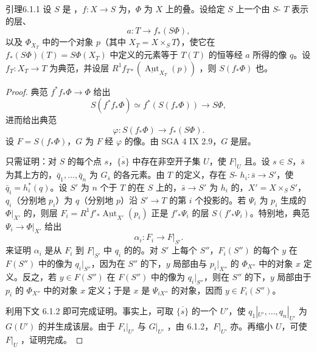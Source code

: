 \begin{SGAresult}{引理}{6.1.1}
设 $S$ 是 ，$f:X\to S$ 为，$\Phi$ 为 $X$ 上的叠。设给定 $S$ 上一个由 $S$- $T$ 表示的层、
\[a:T\longrightarrow f_*(S\Phi),\]
以及 $\Phi_{X_T}$ 中的一个对象 $p$（其中 $X_T=X\times_S T$），使它在 $f_*(S\Phi)(T)=S\Phi(X_T)$ 中定义的元素等于 $T(T)$ 的恒等经 $a$ 所得的像 $q$。设 $f_T:X_T\to T$ 为典范，并设层 $R^1f_{T*}(\underline{\operatorname{Aut}}_{X_T}(p))$ ，则 $S(f_*\Phi)$ 也。
\end{SGAresult}
\begin{proof}
典范 $f^*f_*\Phi\to\Phi$ 给出
\[S(f^*f_*\Phi)\simeq f^*(S(f_*\Phi))\longrightarrow S\Phi,\]
进而给出典范
\[\varphi:S(f_*\Phi)\longrightarrow f_*(S\Phi).\]
设 $F=S(f_*\Phi)$，$G$ 为 $F$ 经 $\varphi$ 的像。由 SGA 4 IX 2.9，$G$ 是层。

只需证明：对 $S$ 的每个点 $s$，$\overline{\{s\}}$ 中存在非空开子集 $U$，使 $F|_U$ 且。设 $s\in S$，$\bar s$ 为其上方的，$\bar q_1,\ldots,\bar q_n$ 为 $G_{\bar s}$ 的各元素。由 $T$ 的定义，存在 $S$- $h_i:\bar s\to S'$，使 $\bar q_i=h_i^*(q)$。设 $S'$ 为 $n$ 个于 $T$ 的在 $S$ 上的，$\bar s\to S'$ 为 $h_i$ 的，$X'=X\times_S S'$，$q_i$（分别地 $p_i$）为 $q$（分别地 $p$）沿 $S'\to T$ 的第 $i$ 个投影的。若 $\Psi_i$ 为 $p_i$ 生成的 $\Phi|_{X'}$ 的，则层 $F_i=R^1f'_*\underline{\operatorname{Aut}}_{X'}(p_i)$ 正是 $f'_*\Psi_i$ 的层 $S(f'_*\Psi_i)$。特别地，典范 $\Psi_i\to\Phi|_{X'}$ 给出
\[\alpha_i:F_i\longrightarrow F|_{S'}.\]
来证明 $\alpha_i$ 是从 $F_i$ 到 $F|_{S'}$ 中 $q_i$ 的的。对 $S'$ 上每个 $S''$，$F_i(S'')$ 的每个 $y$ 在 $F(S'')$ 中的像为 $q_i|_{S''}$，因为在 $S''$ 的下，$y$ 局部由与 $p_i|_{X''}$ 的 $\Phi_{X''}$ 中的对象 $x$ 定义。反之，若 $y\in F(S'')$ 在 $F(S'')$ 中的像为 $q_i|_{S''}$，则在 $S''$ 的下，$y$ 局部由于 $p_i$ 的 $\Phi_{X''}$ 中的对象 $x$ 定义；于是 $x$ 是 $\Psi_{iX''}$ 的对象，因而 $y\in F_i(S'')$。

利用下文 6.1.2 即可完成证明。事实上，可取 $\overline{\{s\}}$ 的一个 $U'$，使 $q_1|_{U'},\ldots,q_n|_{U'}$ 为 $G(U')$ 的并生成该层。由于 $F_i|_{U'}$ 与 $G|_{U'}$ ，由 6.1.2，$F|_{U'}$ 亦。再缩小 $U$，可使 $F|_U$ ，证明完成。
\end{proof}

